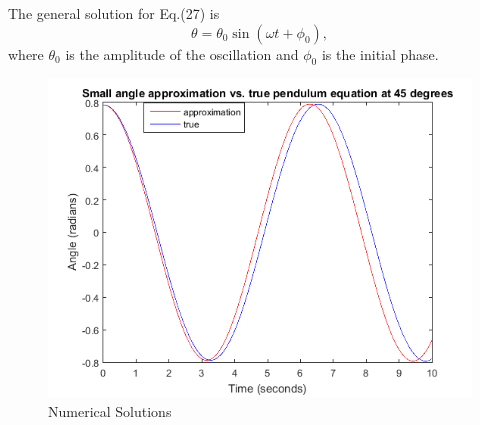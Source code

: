 \documentclass[%
 reprint,
 amsmath,amssymb,
 aps,
]{revtex4-1}
\begin{document}
The general solution  for Eq.(27) is 
\begin{equation}
    \theta=\theta_0\sin{(\omega t+\phi_0)},
\end{equation}
where $\theta_0$ is the amplitude of the oscillation and $\phi_0$ is the initial phase.

\begin{figure}[h!]
	\centering
	\includegraphics[scale=0.5]{Pendulum-trueVSest.png}
	\caption{Numerical Solutions}
	\label{fig2}
\end{figure}
\end{document}
